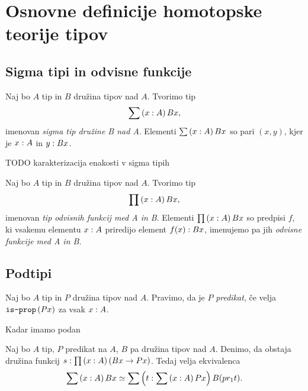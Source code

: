 \section{Osnovne definicije homotopske teorije tipov}

\subsection{Sigma tipi in odvisne funkcije}

\begin{definicija}
  Naj bo \(A\) tip in \(B\) družina tipov nad \(A\). Tvorimo tip \[\sum \left( x : A \right) Bx,\]
  imenovan \emph{sigma tip družine B nad A}. Elementi \(\sum \left( x : A \right) Bx\) so pari
  \(\left(x, y\right)\), kjer je \(x : A\) in \(y : Bx\).
\end{definicija}

\begin{trditev}
  \label{eq-Sigma}
  TODO karakterizacija enakosti v sigma tipih
\end{trditev}

\begin{definicija}
  Naj bo \(A\) tip in \(B\) družina tipov nad \(A\). Tvorimo tip \[\prod \left( x : A \right) Bx,\]
  imenovan \emph{tip odvisnih funkcij med A in B}. Elementi
  \(\prod \left( x : A \right) Bx\) so predpisi \(f\), ki vsakemu elementu \(x : A\)
  priredijo element \(f(x) : Bx\), imenujemo pa jih
  \emph{odvisne funkcije med A in B}.
\end{definicija}

\subsection{Podtipi}

\begin{definicija}
  Naj bo \(A\) tip in \(P\) družina tipov nad \(A\). Pravimo, da je \(P\) \emph{predikat},
  če velja \(\textnormal{\texttt{is-prop}}\,(Px)\) za vsak \(x : A\).
\end{definicija}
Kadar imamo podan

\begin{trditev}
  \label{full-subtype}
  Naj bo \(A\) tip, \(P\) predikat na \(A\), \(B\) pa družina tipov nad \(A\). Denimo, da
  obstaja družina funkcij \(s : \prod \left( x : A \right) (Bx \to Px)\).
  Tedaj velja ekvivalenca
  \[\sum \left( x : A \right) Bx \simeq \sum \left( t : \sum \left( x : A \right) Px \right) B (pr_{1} t).\]
\end{trditev}

